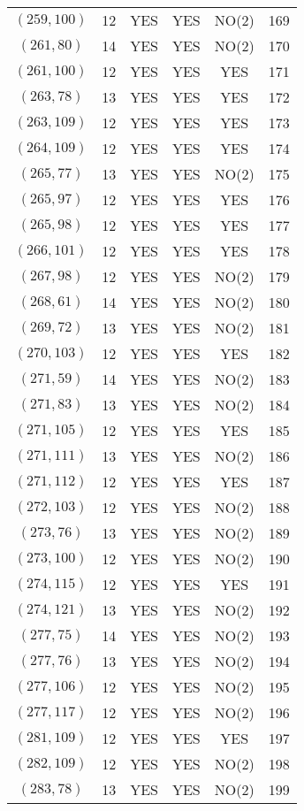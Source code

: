 \begin{longtable}{|c|c|c|c|c|c|}
$(259, 100)$ & 12 & YES & YES & NO(2) & 169\\
$(261, 80)$ & 14 & YES & YES & NO(2) & 170\\
$(261, 100)$ & 12 & YES & YES & YES & 171\\
$(263, 78)$ & 13 & YES & YES & YES & 172\\
$(263, 109)$ & 12 & YES & YES & YES & 173\\
$(264, 109)$ & 12 & YES & YES & YES & 174\\
$(265, 77)$ & 13 & YES & YES & NO(2) & 175\\
$(265, 97)$ & 12 & YES & YES & YES & 176\\
$(265, 98)$ & 12 & YES & YES & YES & 177\\
$(266, 101)$ & 12 & YES & YES & YES & 178\\
$(267, 98)$ & 12 & YES & YES & NO(2) & 179\\
$(268, 61)$ & 14 & YES & YES & NO(2) & 180\\
$(269, 72)$ & 13 & YES & YES & NO(2) & 181\\
$(270, 103)$ & 12 & YES & YES & YES & 182\\
$(271, 59)$ & 14 & YES & YES & NO(2) & 183\\
$(271, 83)$ & 13 & YES & YES & NO(2) & 184\\
$(271, 105)$ & 12 & YES & YES & YES & 185\\
$(271, 111)$ & 13 & YES & YES & NO(2) & 186\\
$(271, 112)$ & 12 & YES & YES & YES & 187\\
$(272, 103)$ & 12 & YES & YES & NO(2) & 188\\
$(273, 76)$ & 13 & YES & YES & NO(2) & 189\\
$(273, 100)$ & 12 & YES & YES & NO(2) & 190\\
$(274, 115)$ & 12 & YES & YES & YES & 191\\
$(274, 121)$ & 13 & YES & YES & NO(2) & 192\\
$(277, 75)$ & 14 & YES & YES & NO(2) & 193\\
$(277, 76)$ & 13 & YES & YES & NO(2) & 194\\
$(277, 106)$ & 12 & YES & YES & NO(2) & 195\\
$(277, 117)$ & 12 & YES & YES & NO(2) & 196\\
$(281, 109)$ & 12 & YES & YES & YES & 197\\
$(282, 109)$ & 12 & YES & YES & NO(2) & 198\\
$(283, 78)$ & 13 & YES & YES & NO(2) & 199\\

\end{longtable}
